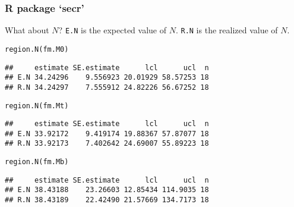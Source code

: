 \documentclass[color=usenames,dvipsnames]{beamer}\usepackage[]{graphicx}\usepackage[]{xcolor}
\makeatletter
\newcommand{\hldef}[1]{\textcolor[rgb]{0,0,0}{#1}}%
\newcommand{\hlkwd}[1]{\textcolor[rgb]{0.004,0.004,0.506}{#1}}%
\newenvironment{kframe}{%
 \def\at@end@of@kframe{}%
 \ifinner\ifhmode%
  \def\at@end@of@kframe{\end{minipage}}%
  \begin{minipage}{\columnwidth}%
 \fi\fi%
 \def\FrameCommand##1{\hskip\@totalleftmargin \hskip-\fboxsep
 \colorbox{shadecolor}{##1}\hskip-\fboxsep
     \hskip-\linewidth \hskip-\@totalleftmargin \hskip\columnwidth}%
 \MakeFramed {\advance\hsize-\width
   \@totalleftmargin\z@ \linewidth\hsize
   \@setminipage}}%
 {\par\unskip\endMakeFramed%
 \at@end@of@kframe}
\newenvironment{knitrout}{}{} %
\newcommand{\inr}[1]{\colorbox{inlinecolor}{\texttt{#1}}}
\makeatother
\begin{document}
\begin{frame}[fragile]
  \frametitle{R package `secr'}
  What about $N$? \pause \inr{E.N} is the expected value of
  $N$. \inr{R.N} is the realized value of $N$. 
  \vfill
\begin{knitrout}\footnotesize
{}\color{fgcolor}\begin{kframe}
\begin{alltt}
\hlkwd{region.N}\hldef{(fm.M0)}
\end{alltt}
\begin{verbatim}
##     estimate SE.estimate      lcl      ucl  n
## E.N 34.24296    9.556923 20.01929 58.57253 18
## R.N 34.24297    7.555912 24.82226 56.67252 18
\end{verbatim}
\end{kframe}
\end{knitrout}
  \pause
\begin{knitrout}\footnotesize
{}\color{fgcolor}\begin{kframe}
\begin{alltt}
\hlkwd{region.N}\hldef{(fm.Mt)}
\end{alltt}
\begin{verbatim}
##     estimate SE.estimate      lcl      ucl  n
## E.N 33.92172    9.419174 19.88367 57.87077 18
## R.N 33.92173    7.402642 24.69007 55.89223 18
\end{verbatim}
\end{kframe}
\end{knitrout}
  \pause
\begin{knitrout}\footnotesize
{}\color{fgcolor}\begin{kframe}
\begin{alltt}
\hlkwd{region.N}\hldef{(fm.Mb)}
\end{alltt}
\begin{verbatim}
##     estimate SE.estimate      lcl      ucl  n
## E.N 38.43188    23.26603 12.85434 114.9035 18
## R.N 38.43189    22.42490 21.57669 134.7173 18
\end{verbatim}
\end{kframe}
\end{knitrout}
\end{frame}
\end{document}
